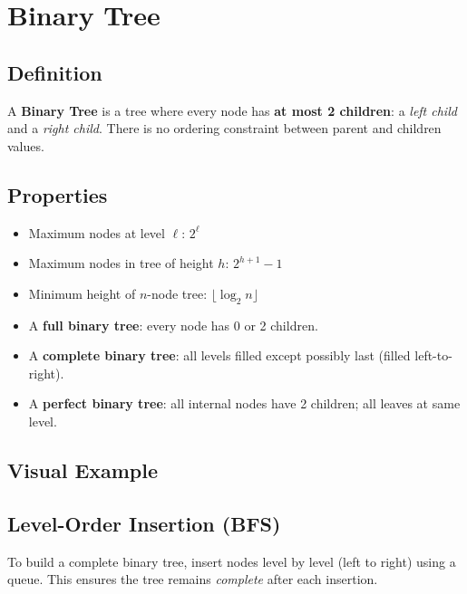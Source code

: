 \documentclass[12pt,a4paper]{article}
\begin{document}
\section{Binary Tree}

\subsection{Definition}
A \textbf{Binary Tree} is a tree where every node has \textbf{at most 2 children}: a \textit{left child} and a \textit{right child}. There is no ordering constraint between parent and children values.

\subsection{Properties}
\begin{itemize}
    \item Maximum nodes at level $\ell$: $2^\ell$
    \item Maximum nodes in tree of height $h$: $2^{h+1} - 1$
    \item Minimum height of $n$-node tree: $\lfloor \log_2 n \rfloor$
    \item A \textbf{full binary tree}: every node has 0 or 2 children.
    \item A \textbf{complete binary tree}: all levels filled except possibly last (filled left-to-right).
    \item A \textbf{perfect binary tree}: all internal nodes have 2 children; all leaves at same level.
\end{itemize}

\subsection{Visual Example}
\begin{center}
\end{center}

\subsection{Level-Order Insertion (BFS)}
To build a complete binary tree, insert nodes level by level (left to right) using a queue. This ensures the tree remains \textit{complete} after each insertion.
\end{document}
